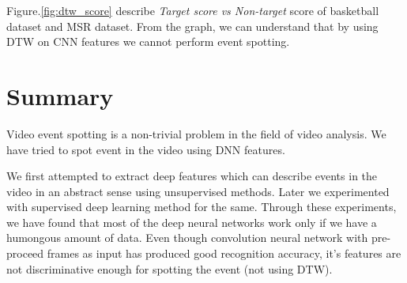 Figure.\ref{fig:dtw_score} describe \textit{Target score vs Non-target} score of basketball dataset and MSR dataset.  From the graph, we can understand that by using DTW on CNN features we cannot perform event spotting.

\section{Summary}

Video event spotting is a non-trivial problem in the field of video analysis.  We have tried to spot event in the video using DNN features.

We first attempted to extract deep features which can describe events in the video in an abstract sense using unsupervised methods.  Later we experimented with supervised deep learning method for the same.  Through these experiments, we have found that most of the deep neural networks work only if we have a humongous amount of data.  Even though convolution neural network with pre-proceed frames as input has produced good recognition accuracy, it's features are not discriminative enough for spotting the event (not using DTW).